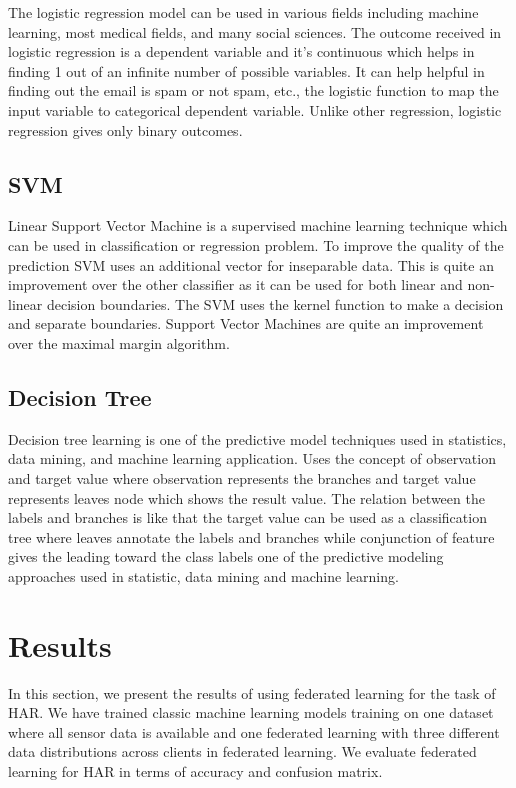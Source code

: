 \documentclass[12pt,conference]{IEEEtran}
\begin{document}
The logistic regression model can be used in various fields including machine learning, most medical fields, and many social sciences. The outcome received in logistic regression is a dependent variable and it's continuous which helps in finding 1 out of an infinite number of possible variables. It can help helpful in finding out the email is spam or not spam, etc., the logistic function to map the input variable to categorical dependent variable. Unlike other regression, logistic regression gives only binary outcomes.

\subsection{SVM}

Linear Support Vector Machine is a supervised machine learning technique which can be used in classification or regression problem. To improve the quality of the prediction SVM uses an additional vector for inseparable data. This is quite an improvement over the other classifier as it can be used for both linear and non-linear decision boundaries. The SVM uses the kernel function to make a decision and separate boundaries. Support Vector Machines are quite an improvement over the maximal margin algorithm.

\subsection{Decision Tree}

Decision tree learning is one of the predictive model techniques used in statistics, data mining, and machine learning application. Uses the concept of observation and target value where observation represents the branches and target value represents leaves node which shows the result value. The relation between the labels and branches is like that the target value can be used as a classification tree where leaves annotate the labels and branches while conjunction of feature gives the leading toward the class labels one of the predictive modeling approaches used in statistic, data mining and machine learning.


\section{
\textbf{Results}
}

In this section, we present the results of using federated learning for the task of HAR. We have trained classic machine learning models training on one dataset where all sensor data is available and one federated learning with three different data distributions across clients in federated learning. We evaluate federated learning for HAR in terms of accuracy and confusion matrix.
\end{document}
